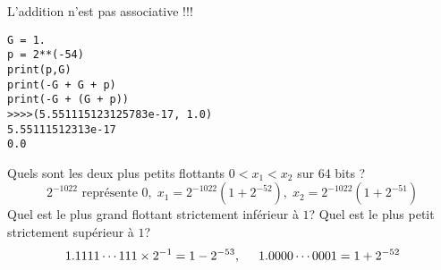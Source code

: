 L'addition n'est pas associative !!!
\begin{verbatim}
G = 1.
p = 2**(-54)
print(p,G)
print(-G + G + p)
print(-G + (G + p))
>>>>(5.551115123125783e-17, 1.0)
5.55111512313e-17
0.0
\end{verbatim}
Quels sont les deux plus petits flottants $0<x_1<x_2$ sur 64 bits ?
\begin{displaymath}
   2^{-1022}\text{ représente }0,\; x_1 = 2^{-1022}(1 + 2^{-52}),\; x_2=2^{-1022}(1 + 2^{-51})  
\end{displaymath}
Quel est le plus grand flottant strictement inférieur à $1$? Quel est le plus petit strictement supérieur à $1$?
\begin{displaymath}
  1.1111\cdots 111 \times 2^{-1} = 1 -2^{-53},\hspace{0.5cm} 1.0000 \cdots 0001 = 1+2^{-52}
\end{displaymath}


